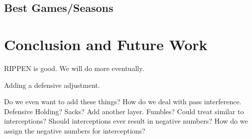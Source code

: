 \documentclass[aoas]{imsart}\usepackage[]{graphicx}\usepackage[]{color}
\begin{document}
\subsection{Best Games/Seasons}

\section{Conclusion and Future Work}
RIPPEN is good.  We will do more eventually.  

Adding a defensive adjustment.  


Do we even want to add these things?  
How do we deal with pass interference.  
Defensive Holding? 
Sacks? Add another layer.  
Fumbles? Could treat similar to interceptions? 
Should interceptions ever result in negative numbers?  
How do we assign the negative numbers for interceptions?  










\end{document}
